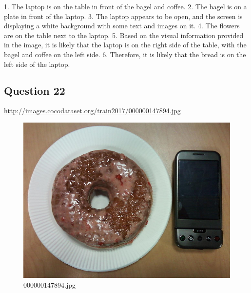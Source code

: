 \begin{enumerate}
        1. The laptop is on the table in front of the bagel and coffee.
        2. The bagel is on a plate in front of the laptop.
        3. The laptop appears to be open, and the screen is displaying a white background with some text and images on it.
        4. The flowers are on the table next to the laptop.
        5. Based on the visual information provided in the image, it is likely that the laptop is on the right side of the table, with the bagel and coffee on the left side.
        6. Therefore, it is likely that the bread is on the left side of the laptop.
    \end{enumerate}
\subsection*{Question 22}
\url{http://images.cocodataset.org/train2017/000000147894.jpg}
    \begin{figure}[h]
        \centering
        \includegraphics[width=0.8\linewidth]{../image set/easy/000000147894.jpg}
        \caption{000000147894.jpg}
    \end{figure}
